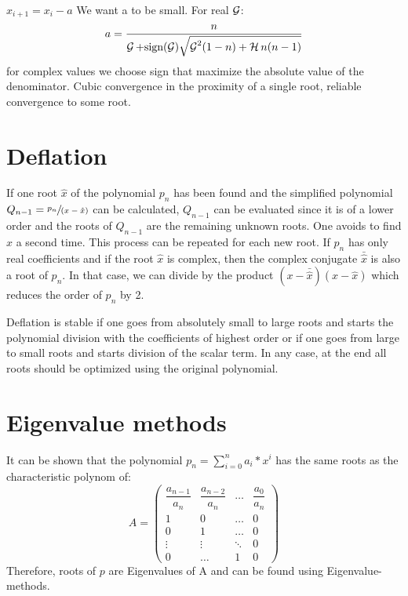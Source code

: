 $x_{i+1}=x_i -a$ We want a to be small.
For real $\operatorname{\mathcal{G}}$:
\begin{equation*}
    a = \frac{n}{\operatorname{\mathcal{G}} + \text{sign}(\operatorname{\mathcal{G}}) \sqrt {\operatorname{\mathcal{G}}^2(1-n)+ \operatorname{\mathcal{H}} n(n-1)}}
\end{equation*}
for complex values we choose sign that maximize the absolute value of the denominator.
\textrightarrow{} Cubic convergence in the proximity of a single root, reliable convergence to some root.


\section{Deflation}\label{sec:deflation}
If one root $\hat{x}$ of the polynomial $p_n$ has been found and the simplified polynomial
$Q_{n-1}= \sfrac{p_n}{(x-\hat{x})}$ can be calculated,
$Q_{n-1}$ can be evaluated since it is of a lower order and the roots of $Q_{n-1}$ are the remaining unknown roots.
One avoids to find $\hat{x}$ a second time.
This process can be repeated for each new root.
If $p_n$ has only real coefficients and if the root $\hat{x}$ is complex, then the complex
conjugate  $\bar{\hat{x}}$ is also a root of $p_n$.
In that case, we can divide by the product $(x-\bar{\hat{x}})(x-\hat{x})$ which
reduces the order of $p_n$ by 2.

Deflation is stable if one goes from absolutely small to large roots and starts
the polynomial division with the coefficients of highest order or if one goes
from large to small roots and starts division of the scalar term.
In any case, at the end all roots should be optimized using the original polynomial.


\section{Eigenvalue methods}\label{sec:eigenvalue-methods}
It can be shown that the polynomial $p_n = \sum_{i=0}^{n}a_i*x^i$ has the same roots as the characteristic polynom of:
\begin{equation*}
    A=
    \begin{pmatrix}
        \dfrac{a_{n-1}}{a_n} & \dfrac{a_{n-2}}{a_n} & \dots  & \dfrac{a_0}{a_n}\\[0.9em]
        1                    & 0                    & \dots  & 0\\[0.5em]
        0                    & 1                    & \dots  & 0\\[0.5em]
        \vdots               & \vdots               & \ddots & 0 \\[0.5em]
        0                    & \dots                & 1      & 0
    \end{pmatrix}
\end{equation*}
Therefore, roots of $p$ are Eigenvalues of A and can be found using Eigenvalue-methods.


